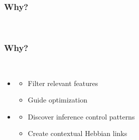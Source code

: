 \documentclass[aspectratio=169]{beamer}
\begin{document}
\begin{frame}
  \frametitle{Why?}



  \\[1cm]


\end{frame}

\begin{frame}
  \frametitle{Why?}


  \\[1cm]
  
  \begin{itemize}
  \item \color{red}{Reasoning for meta-learning}
    \begin{itemize}
    \item Filter relevant features
    \item Guide optimization
    \end{itemize}
  \item \color{red}{Learning for meta-reasoning}
    \begin{itemize}
    \item Discover inference control patterns
    \item Create contextual Hebbian links
    \end{itemize}
  \end{itemize}

\end{frame}
\end{document}
